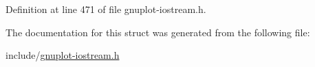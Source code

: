Definition at line 471 of file gnuplot-\/iostream.\+h.



The documentation for this struct was generated from the following file\+:\begin{DoxyCompactItemize}
\item 
include/\hyperlink{gnuplot-iostream_8h}{gnuplot-\/iostream.\+h}\end{DoxyCompactItemize}
